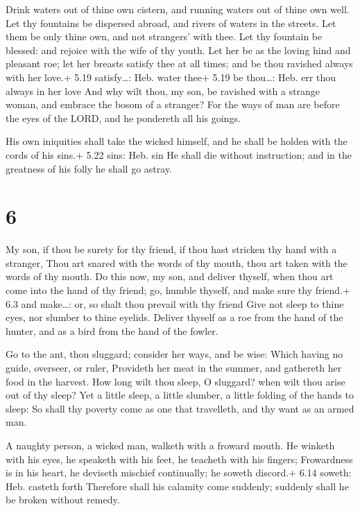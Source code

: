  Drink waters out of thine own cistern, and running
waters out of thine own well.  Let thy fountains be
dispersed abroad, and rivers of waters in the streets.  Let
them be only thine own, and not strangers' with thee.  Let
thy fountain be blessed: and rejoice with the wife of thy youth.
 Let her be as the loving hind and pleasant roe; let her
breasts satisfy thee at all times; and be thou ravished always with her
love.+ 5.19 satisfy\ldots: Heb. water thee+ 5.19 be thou\ldots: Heb. err
thou always in her love  And why wilt thou, my son, be
ravished with a strange woman, and embrace the bosom of a stranger?
 For the ways of man are before the eyes of the LORD, and
he pondereth all his goings.

 His own iniquities shall take the wicked himself, and he
shall be holden with the cords of his sins.+ 5.22 sins: Heb. sin
 He shall die without instruction; and in the greatness of
his folly he shall go astray.

\hypertarget{section-5}{%
\section{6}\label{section-5}}

 My son, if thou be surety for thy friend, if thou hast
stricken thy hand with a stranger,  Thou art snared with the
words of thy mouth, thou art taken with the words of thy mouth.
 Do this now, my son, and deliver thyself, when thou art
come into the hand of thy friend; go, humble thyself, and make sure thy
friend.+ 6.3 and make\ldots: or, so shalt thou prevail with thy friend
 Give not sleep to thine eyes, nor slumber to thine eyelids.
 Deliver thyself as a roe from the hand of the hunter, and
as a bird from the hand of the fowler.

 Go to the ant, thou sluggard; consider her ways, and be
wise:  Which having no guide, overseer, or ruler,
 Provideth her meat in the summer, and gathereth her food in
the harvest.  How long wilt thou sleep, O sluggard? when
wilt thou arise out of thy sleep?  Yet a little sleep, a
little slumber, a little folding of the hands to sleep:  So
shall thy poverty come as one that travelleth, and thy want as an armed
man.

 A naughty person, a wicked man, walketh with a froward
mouth.  He winketh with his eyes, he speaketh with his
feet, he teacheth with his fingers;  Frowardness is in his
heart, he deviseth mischief continually; he soweth discord.+ 6.14
soweth: Heb. casteth forth  Therefore shall his calamity
come suddenly; suddenly shall he be broken without remedy.

